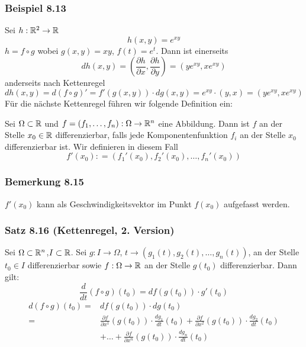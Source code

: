 \subsubsection*{Beispiel 8.13}
Sei $h:\mathbb{R}^2\to\mathbb{R}$ \[h(x,y)=e^{xy}\] $h= f\circ g$ wobei $g(x,y)=xy$, $f(t)=e^t$. Dann ist einerseits \[dh\left( {x,y} \right) = \left( {\frac{{\partial h}}{{\partial x}},\frac{{\partial h}}{{\partial y}}} \right) = \left( {y{e^{xy}},x{e^{xy}}} \right)\] anderseits nach Kettenregel
\[dh\left( {x,y} \right) = d\left( {f \circ g} \right)' = f'\left( {g\left( {x,y} \right)} \right) \cdot dg\left( {x,y} \right) = {e^{xy}} \cdot \left( {y,x} \right) = \left( {y{e^{xy}},x{e^{xy}}} \right)\]
Für die nächste Kettenregel führen wir folgende Definition ein:

\begin{definition}{8.14}
Sei $\Omega \subset\mathbb{R}$ und $f=\left( f_1,\dots,f_n\right):\Omega\to\mathbb{R}^n$ eine Abbildung. Dann ist $f$ an der Stelle $x_0\in\mathbb{R}$ differenzierbar, falls jede Komponentenfunktion $f_i$ an der Stelle $x_0$ differenzierbar ist. Wir definieren in diesem Fall \[f'\left( {{x_0}} \right): = \left( {{f_1}'\left( {{x_0}} \right),{f_2}'\left( {{x_0}} \right), \ldots ,{f_n}'\left( {{x_0}} \right)} \right)\]
\end{definition}

\subsubsection*{Bemerkung 8.15}
$f'\left( x_0\right)$ kann als Geschwindigkeitsvektor im Punkt $f\left( x_0\right)$ aufgefasst werden.

\subsubsection*{Satz 8.16 (Kettenregel, 2. Version)}
Sei $\Omega\subset\mathbb{R}^n$,$I\subset\mathbb{R}$. Sei $g:I\to\Omega$, $t\to\left( g_1(t), g_2(t),\dots, g_n(t)\right)$, an der Stelle $t_0\in I$ differenzierbar sowie $f:\Omega\to\mathbb{R}$ an der Stelle $g\left( t_0\right)$ differenzierbar. Dann gilt:
\[\frac{d}{{dt}}\left( {f \circ g} \right)\left( {{t_0}} \right) = df\left( {g\left( {{t_0}} \right)} \right) \cdot g'\left( {{t_0}} \right)\]
\begin{align*}
d\left( {f \circ g} \right)\left( {{t_0}} \right) = &df\left( {g\left( {{t_0}} \right)} \right) \cdot dg\left( {{t_0}} \right)\\
 = &\frac{{\partial f}}{{\partial {x^1}}}\left( {g\left( {{t_0}} \right)} \right) \cdot \frac{{d{g_1}}}{{dt}}\left( {{t_0}} \right) + \frac{{\partial f}}{{\partial {x^2}}}\left( {g\left( {{t_0}} \right)} \right) \cdot \frac{{d{g_2}}}{{dt}}\left( {{t_0}} \right)\\ & + \ldots  + \frac{{\partial f}}{{\partial {x^n}}}\left( {g\left( {{t_0}} \right)} \right) \cdot \frac{{d{g_n}}}{{dt}}\left( {{t_0}} \right)
\end{align*}

